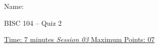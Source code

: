 \documentclass[11pt,paper=a4,answers]{exam}
\begin{document}

\noindent
\begin{minipage}[l]{.5\textwidth}%
\noindent
Name: \underline{\hspace{7cm}}
\end{minipage}
\hfill
\begin{minipage}[r]{0.25\textwidth}%
\begin{center}
{%
\large BISC 104 -- Quiz 2\\[2pt]} %
\end{center}
\end{minipage}
\par
\noindent
\uline{Time: 7 minutes   \hfill \normalsize\emph{\underline{Session 03}} \hfill        Maximum Points: 07}
\end{document}
